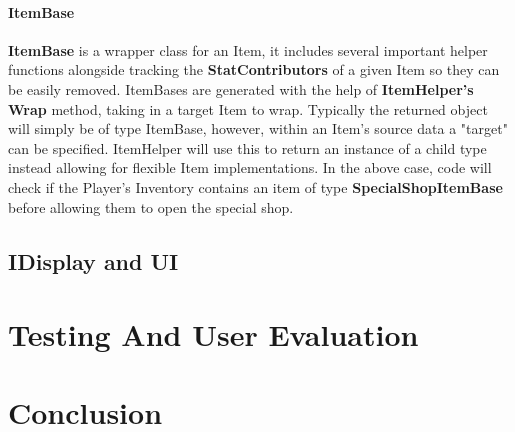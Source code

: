 \documentclass{report}
\begin{document}
\subsubsection{ItemBase}

\textbf{ItemBase} is a wrapper class for an Item, it includes several important helper functions alongside tracking the \textbf{StatContributors} of a given Item so they can be easily removed. ItemBases are generated with the help of \textbf{ItemHelper's} \textbf{Wrap} method, taking in a target Item to wrap. Typically the returned object will simply be of type ItemBase, however, within an Item's source data a "target" can be specified. ItemHelper will use this to return an instance of a child type instead allowing for flexible Item implementations. In the above case, code will check if the Player's Inventory contains an item of type \textbf{SpecialShopItemBase} before allowing them to open the special shop.

\section{IDisplay and UI}

\chapter{Testing And User Evaluation}
\chapter{Conclusion}
\end{document}
